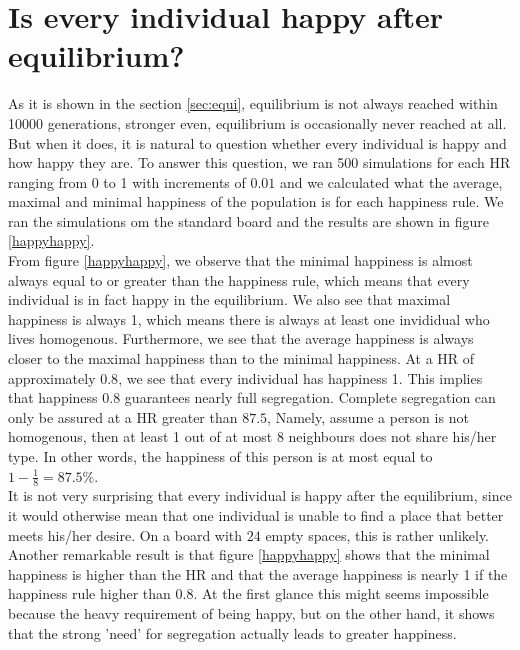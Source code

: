 
\section{Is every individual happy after equilibrium?} 
\label{sec:meanhappy}
As it is shown in the section \ref{sec:equi}, equilibrium is not always reached within 10000 generations, stronger even, equilibrium is occasionally never reached at all.
But when it does, it is natural to question whether every individual is happy and how happy they are. 
To answer this question, we ran 500 simulations for each HR ranging from 0 to 1 with increments of $0.01$ and we calculated what the average, maximal and minimal happiness of the population is for each happiness rule. 
We ran the simulations om the standard board and the results are shown in figure \ref{happyhappy}.\\

From figure \ref{happyhappy}, we observe that the minimal happiness is almost always equal to or greater than the happiness rule, which means that every individual is in fact happy  in the equilibrium. 
We also see that maximal happiness is always 1, which means there is always at least one invididual who lives homogenous. 
Furthermore, we see that the average happiness is always closer to the maximal happiness than to the minimal happiness. At a HR of approximately $0.8$, we see that every individual has happiness 1. 
This implies that happiness $0.8$ guarantees nearly full segregation. Complete segregation can only be assured at a HR greater than $87.5$, Namely, assume a person is not homogenous, then at least 1 out of at most 8 neighbours does not share his/her type. In other words, the happiness of this person is at most equal to \(1-\frac{1}{8}=87.5\%\).\\

It is not very surprising that every individual is happy after the equilibrium, since it would otherwise mean that one individual is unable to find a place that better meets his/her desire. 
On a board with $24$ empty spaces, this is rather unlikely. 
Another remarkable result is that figure \ref{happyhappy} shows that the minimal happiness is higher than the HR and that the average happiness is nearly 1 if the happiness rule higher than $0.8$. 
At the first glance this might seems impossible because the heavy requirement of being happy, but on the other hand, it shows that the strong 'need' for segregation actually leads to greater happiness.


